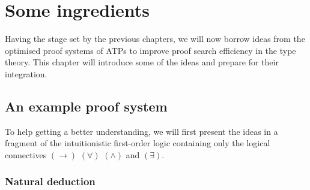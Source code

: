 \documentclass[twoside]{report}
\begin{document}
\chapter{Some ingredients}
\label{sec:ingredients}

Having the stage set by the previous chapters, we will now borrow ideas from the optimised proof systems of ATPs to improve proof search efficiency in the type theory. This chapter will introduce some of the ideas and prepare for their integration.

\section{An example proof system}
\label{sec:example_proof_system}

To help getting a better understanding, we will first present the ideas in a fragment of the intuitionistic first-order logic \cite{gentzen1964investigations} containing only the logical connectives $(\to)$ $(\forall)$ $(\land)$ and $(\exists)$.

\subsection*{Natural deduction}
\end{document}
